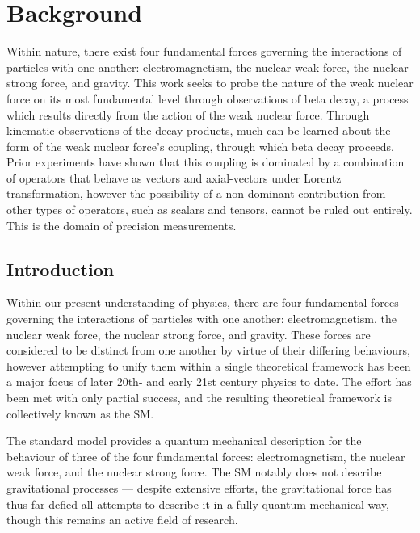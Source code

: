 %
%
%
\chapter{Background}
\label{intro_chapter}
\label{nuclear_chapter}
Within nature, there exist four fundamental forces governing the interactions of particles with one another:  electromagnetism, the nuclear weak force, the nuclear strong force, and gravity.  This work seeks to probe the nature of the weak nuclear force on its most fundamental level through observations of beta decay, a process which results directly from the action of the weak nuclear force.  Through kinematic observations of the decay products, much can be learned about the form of the weak nuclear force's coupling, through which beta decay proceeds.  Prior experiments have shown that this coupling is dominated by a combination of operators that behave as vectors and axial-vectors under Lorentz transformation, however 
the possibility of a non-dominant contribution from other types of operators, such as scalars and tensors, cannot be ruled out entirely.  This is the domain of precision measurements.  

\section{Introduction}
\label{section:intro}
Within our present understanding of physics, there are four fundamental forces governing the interactions of particles with one another:  electromagnetism, the nuclear weak force, the nuclear strong force, and gravity.  These forces are considered to be distinct from one another by virtue of their differing behaviours, however attempting to unify them within a single theoretical framework has been a major focus of later 20th- and early 21st century physics to date.  The effort has been met with only partial success, and the resulting theoretical framework is collectively known as the \ac{SM}.

The standard model provides a quantum mechanical description for
the behaviour of three of the four fundamental forces:  electromagnetism, the nuclear weak force, and the nuclear strong force.  The \ac{SM} notably does not describe gravitational processes --- despite extensive efforts, the gravitational force has thus far defied all attempts to describe it in a fully quantum mechanical way, though this remains an active field of research.  

